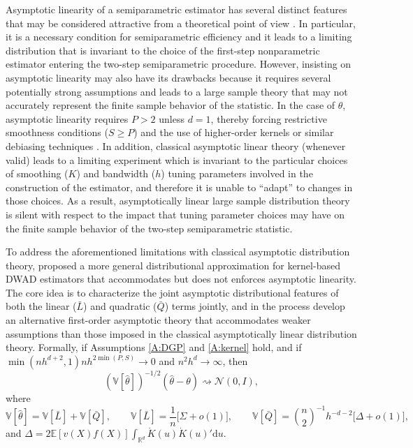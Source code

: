 \documentclass[11pt]{article}
\numberwithin{equation}{section}
\theoremstyle{definition}
\newcommand{\E}{\mathbb{E}}
\newcommand{\V}{\mathbb{V}}
\begin{document}
Asymptotic linearity of a semiparametric estimator has several distinct features that may be considered attractive from a theoretical point of view \citep{Newey_1994_ECMA}. In particular, it is a necessary condition for semiparametric efficiency and it leads to a limiting distribution that is invariant to the choice of the first-step nonparametric estimator entering the two-step semiparametric procedure. However, insisting on asymptotic linearity may also have its drawbacks because it requires several potentially strong assumptions and leads to a large sample theory that may not accurately represent the finite sample behavior of the statistic. In the case of $\widehat{\theta}$, asymptotic linearity requires $P>2$ unless $d=1$, thereby forcing restrictive smoothness conditions ($S\geq P$) and the use of higher-order kernels or similar debiasing techniques \citep[see, e.g.,][and references therein]{Chernozhukov-etal_2022_ECMA}. In addition, classical asymptotic linear theory (whenever valid) leads to a limiting experiment which is invariant to the particular choices of smoothing ($K$) and bandwidth ($h$) tuning parameters involved in the construction of the estimator, and therefore it is unable to ``adapt'' to changes in those choices. As a result, asymptotically linear large sample distribution theory is silent with respect to the impact that tuning parameter choices may have on the finite sample behavior of the two-step semiparametric statistic.

To address the aforementioned limitations with classical asymptotic distribution theory, \citet{Cattaneo-Crump-Jansson_2014a_ET} proposed a more general distributional approximation for kernel-based DWAD estimators that accommodates but does not enforces asymptotic linearity. The core idea is to characterize the joint asymptotic distributional features of both the linear ($\bar{L}$) and quadratic ($\bar{Q}$) terms jointly, and in the process develop an alternative first-order asymptotic theory that accommodates weaker assumptions than those imposed in the classical asymptotically linear distribution theory. Formally, if Assumptions \ref{A:DGP} and \ref{A:kernel} hold,
and if $\min( nh^{d+2},1) nh^{2\min(P,S) }\to 0$ and $n^{2}h^{d}\to \infty$, then
\begin{equation}\label{eq:SB-Distribution}
    (\V[\widehat{\theta}])^{-1/2}(\widehat{\theta}-\theta)\rightsquigarrow\mathcal{N}(0,I),
\end{equation}
where
\[\V[\widehat{\theta}] = \V[\bar{L}] + \V[\bar{Q}], \qquad
  \V[\bar{L}] = \frac{1}{n} \big[ \Sigma + o(1) \big], \qquad
  \V[\bar{Q}] = \binom{n}{2}^{-1} h^{-d-2} \big[ \Delta + o(1) \big],
\]
and $\Delta = 2\E[v({X})f(X)] \int_{\mathbb{R}^{d}}\dot{K}(u) \dot{K}(u)'\text{d}u$.
\end{document}
